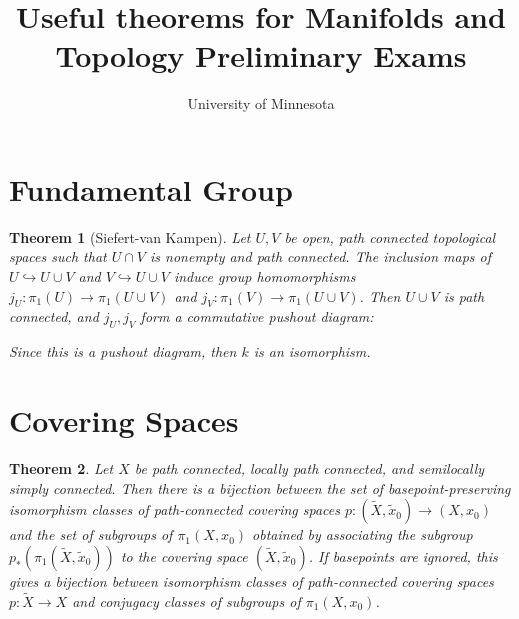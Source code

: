\documentclass{article}
\title{Useful theorems for Manifolds and Topology Preliminary Exams}
\author{University of Minnesota}
\newtheorem*{theorem}{Theorem}
\begin{document}
\maketitle

\section{Fundamental Group}

\begin{theorem}[Siefert-van Kampen]

Let $U,V$ be open, path connected topological spaces such that $U \cap V$ is nonempty and path connected. The inclusion maps of $U \hookrightarrow U \cup V$ and $V \hookrightarrow U \cup V$ induce group homomorphisms $j_U:\pi_1(U) \rightarrow \pi_1(U \cup V)$ and $j_V: \pi_1(V) \rightarrow \pi_1(U \cup V)$. Then $U \cup V$ is path connected, and $j_U, j_V$ form a commutative pushout diagram:
			
			\begin{center}\end{center}

Since this is a pushout diagram, then $k$ is an isomorphism.

\end{theorem}

\section{Covering Spaces}

\begin{theorem}
Let $X$ be path connected, locally path connected, and semilocally simply connected. Then there is a bijection between the set of basepoint-preserving isomorphism classes of path-connected covering spaces $p:(\tilde{X},\tilde{x}_0) \rightarrow (X,x_0)$ and the set of subgroups of $\pi_1(X,x_0)$ obtained by associating the subgroup $p_*(\pi_1(\tilde{X}, \tilde{x}_0))$ to the covering space $(\tilde{X}, \tilde{x}_0)$. If basepoints are ignored, this gives a bijection between isomorphism classes of path-connected covering spaces $p: \tilde{X} \rightarrow X$ and conjugacy classes of subgroups of $\pi_1(X,x_0)$.
\end{theorem}
\end{document}
